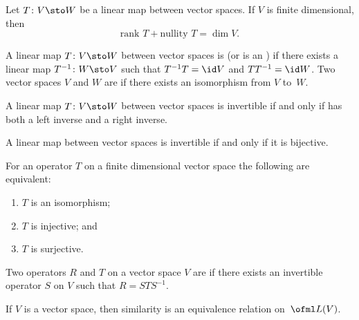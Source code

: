 \begin{prop} Let $T\colon V \sto W$ be a linear map between vector spaces. If $V$ is finite dimensional, then
  \[ \textrm{rank }T + \textrm{nullity }T = \dim V. \]
\end{prop}

\begin{defn} A linear map $T\colon V \sto W$ between vector spaces is
 (or is an
) if there exists a linear map $T^{-1}\colon W \sto V$ such that $T^{-1}T
= \id V$ and $TT^{-1} = \id W$.  Two vector spaces $V$ and $W$ are
 if there exists an isomorphism from $V$ to~$W$.
\end{defn}

\begin{prop}\label{inv_lin_maps001} A linear map $T\colon V \sto W$ between vector spaces
is invertible if and only if has both a left inverse and a right inverse.
\end{prop}

\begin{prop}\label{inv_lin_maps004} A linear map between vector spaces is invertible if
and only if it is bijective.
\end{prop}

\begin{prop} For an operator $T$ on a finite dimensional vector space the following are equivalent:
 \begin{enumerate}
    \item $T$ is an isomorphism;
    \item $T$ is injective; and
    \item $T$ is surjective.
 \end{enumerate}
\end{prop}

 \begin{defn}\label{defn_similar_vs_ops} Two operators $R$ and $T$ on a vector space $V$ are
 if there exists an invertible operator $S$ on $V$ such that $R = STS^{-1}$.
\end{defn}

\begin{prop}\label{sim004thm} If $V$ is a vector space, then similarity is an equivalence
relation on~$\ofml L(V)$.
\end{prop}

